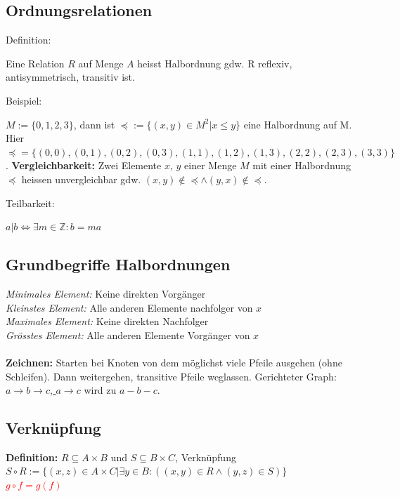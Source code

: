 \documentclass[8pt,landscape]{scrartcl}
\begin{document}
\begin{multicols}{3}
\subsection{Ordnungsrelationen}
\begin{bf}Definition:\end{bf} Eine Relation $R$ auf Menge $A$ heisst Halbordnung gdw. R reflexiv, antisymmetrisch, transitiv ist.\\
\begin{bf}Beispiel:\end{bf} $M := \{0, 1, 2, 3\}$, dann ist $\preceq := \{ (x, y) \in M^2 | x \leq y \}$ eine Halbordnung auf M.
Hier $\preceq = \{ (0, 0), (0, 1), (0, 2), (0, 3), (1, 1), (1, 2), (1, 3), (2, 2), (2, 3), (3, 3)\}$.
\textbf{Vergleichbarkeit:} Zwei Elemente $x$, $y$ einer Menge $M$ mit einer Halbordnung $\preceq$ heissen unvergleichbar gdw. $(x, y) \not \in \preceq \land (y, x) \not \in \preceq$.

\begin{bf}Teilbarkeit:\end{bf} $a|b \iff \exists m \in \mathbb{Z} : b = ma$

\subsection{Grundbegriffe Halbordnungen}
\textit{Minimales Element:} Keine direkten Vorg\"anger\\
\textit{Kleinstes Element:} Alle anderen Elemente nachfolger von $x$\\
\textit{Maximales Element:} Keine direkten Nachfolger\\
\textit{Gr\"osstes Element:} Alle anderen Elemente Vorg\"anger von $x$\\\\
\textbf{Zeichnen:} Starten bei Knoten von dem m\"oglichst viele Pfeile ausgehen (ohne Schleifen).
Dann weitergehen, transitive Pfeile weglassen.
Gerichteter Graph: \underline{$a \rightarrow b \rightarrow c$, $a \rightarrow c$} wird zu $a - b - c$.

\subsection{Verkn\"upfung}
\textbf{Definition:} $R \subseteq A \times B$ und $S \subseteq B \times C$, Verkn\"upfung\\
$S \circ R := \{ (x, z) \in A \times C | \exists y \in B : ( (x, y) \in R \land (y, z) \in S ) \}$\\
\textcolor{red}{$g \circ f = g(f)$}


\end{multicols}
\end{document}
